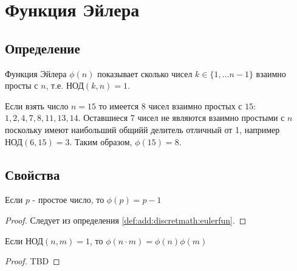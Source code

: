 \section{Функция Эйлера}

\subsection{Определение}
\begin{definition}
Функция Эйлера $\phi\left(n\right)$ показывает сколько чисел $k \in
\{1, ... n-1\}$ взаимно просты с $n$, т.е. $\mbox{НОД}\left(k,
n\right) = 1$.
\label{def:add:discretmath:eulerfun}
\end{definition}

\begin{example}
  Если взять число $n=15$ то имеется 8 чисел взаимно простых с $15$: 
  $1, 2, 4, 7, 8, 11, 13, 14$. Оставшиеся 7 чисел не являются взаимно
  простыми с $n$ поскольку имеют наибольший общийй делитель отличный
  от 1, например $\mbox{НОД}\left(6, 15\right) = 3$.
  Таким образом, $\phi\left(15\right) = 8$. 
\end{example}


\subsection{Свойства}

\begin{property}
Если $p$ - простое число, то $\phi(p) = p - 1$
\begin{proof}
Следует из определения \ref{def:add:discretmath:eulerfun}.
\end{proof}
\label{prop:add:discretmath:eulerfun1}
\end{property}


\begin{property}
Если $\mbox{НОД}\left(n, m\right) = 1$, то
$\phi\left(n \cdot m\right) = \phi\left(n\right) \phi\left( m\right)$
\begin{proof}
TBD
\end{proof}
\label{prop:add:discretmath:eulerfun2}
\end{property}
